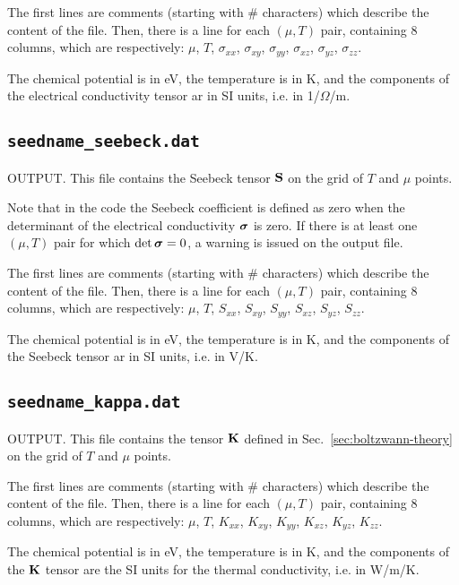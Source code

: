 The first lines are comments (starting with \# characters) which describe the content of the file.
Then, there is a line for each $(\mu,T)$ pair, containing 8 columns, which are respectively: $\mu$, $T$, $\sigma_{xx}$, $\sigma_{xy}$, $\sigma_{yy}$, $\sigma_{xz}$, $\sigma_{yz}$, $\sigma_{zz}$.

The chemical potential is in eV, the temperature is in K, and the components of the electrical conductivity tensor ar in SI units, i.e. in 1/$\Omega$/m.
\subsection{{\tt seedname\_seebeck.dat}}
OUTPUT. This file contains the Seebeck tensor $\bm{\mathrm{S}}$ on the grid of $T$ and $\mu$ points. 

Note that in the code the Seebeck coefficient is defined as zero when the determinant of the electrical conductivity $\bm{\mathrm{\sigma}}$ is zero. If there is at least one $(\mu, T)$ pair for which $\det \bm{\mathrm{\sigma}}=0$, a warning is issued on the output file.

The first lines are comments (starting with \# characters) which describe the content of the file.
Then, there is a line for each $(\mu,T)$ pair, containing 8 columns, which are respectively: $\mu$, $T$, $S_{xx}$, $S_{xy}$, $S_{yy}$, $S_{xz}$, $S_{yz}$, $S_{zz}$.

The chemical potential is in eV, the temperature is in K, and the components of the Seebeck tensor ar in SI units, i.e. in V/K.

\subsection{{\tt seedname\_kappa.dat}}
OUTPUT. This file contains the tensor $\bm{\mathrm{K}}$ defined in Sec.~\ref{sec:boltzwann-theory} on the grid of $T$ and $\mu$ points.

The first lines are comments (starting with \# characters) which describe the content of the file.
Then, there is a line for each $(\mu,T)$ pair, containing 8 columns, which are respectively: $\mu$, $T$, $K_{xx}$, $K_{xy}$, $K_{yy}$, $K_{xz}$, $K_{yz}$, $K_{zz}$.

The chemical potential is in eV, the temperature is in K, and the components of the $\bm{\mathrm{K}}$ tensor are the SI units for the thermal conductivity, i.e. in W/m/K.





